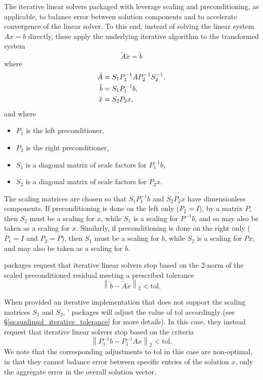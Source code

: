 The iterative linear solvers packaged with {\sundials} leverage
scaling and preconditioning, as applicable, to balance error between
solution components and to accelerate convergence of the linear
solver.  To this end, instead of solving the  linear system $Ax = b$
directly, these apply the underlying iterative algorithm to the
transformed system
\begin{equation}
  \label{eq:transformed_linear_system}
  \tilde{A} \tilde{x} = \tilde{b}
\end{equation}
where
\begin{align}
  \notag
  \tilde{A} &= S_1 P_1^{-1} A P_2^{-1} S_2^{-1},\\
  \label{eq:transformed_linear_system_components}
  \tilde{b} &= S_1 P_1^{-1} b,\\
  \notag
  \tilde{x} &= S_2 P_2 x,
\end{align}
and where
\begin{itemize}
\item $P_1$ is the left preconditioner,
\item $P_2$ is the right preconditioner,
\item $S_1$ is a diagonal matrix of scale factors for $P_1^{-1} b$,
\item $S_2$ is a diagonal matrix of scale factors for $P_2 x$.
\end{itemize}
The scaling matrices are chosen so that $S_1 P_1^{-1} b$ and $S_2 P_2 x$
have dimensionless components. If preconditioning is done on the left only
($P_2 = I$), by a  matrix $P$, then $S_2$ must be a scaling for $x$, while $S_1$
is a scaling for $P^{-1} b$, and so may also be taken as a scaling for $x$.
Similarly, if preconditioning is done on the right only ($P_1 = I$ and
$P_2 = P$), then $S_1$ must be a scaling for $b$, while $S_2$ is a scaling for
$P x$, and may also be taken as a scaling for $b$. 

{\sundials} packages request that iterative linear solvers stop
based on the 2-norm of the scaled preconditioned residual meeting a
prescribed tolerance
\[
  \left\| \tilde{b} - \tilde{A} \tilde{x} \right\|_2  <  \text{tol}.
\]

When provided an iterative {\sunlinsol} implementation that does not
support the scaling matrices $S_1$ and $S_2$, {\sundials}'
packages will adjust the value of $\text{tol}$ accordingly
(see \S\ref{ss:sunlinsol_iterative_tolerance} for more details). In
this case, they instead request that iterative linear solvers stop
based on the criteria
\[
   \left\| P_1^{-1} b - P_1^{-1} A x \right\|_2  <  \text{tol}.
\]
We note that the corresponding adjustments to $\text{tol}$ in
this case are non-optimal, in that they cannot balance error between
specific entries of the solution $x$, only the aggregate error
in the overall solution vector.

